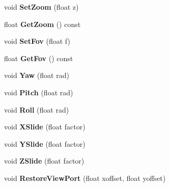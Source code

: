 \begin{DoxyCompactItemize}
\item 
void {\bfseries Set\+Zoom} (float z)\hypertarget{classCamera_ae260d200c0de40a8bd474b3e964fcec3}{}\label{classCamera_ae260d200c0de40a8bd474b3e964fcec3}

\item 
float {\bfseries Get\+Zoom} () const \hypertarget{classCamera_a68d9f0b5127fc2526bdb95840358dab8}{}\label{classCamera_a68d9f0b5127fc2526bdb95840358dab8}

\item 
void {\bfseries Set\+Fov} (float f)\hypertarget{classCamera_adc85190cf830510bb201522655562b1c}{}\label{classCamera_adc85190cf830510bb201522655562b1c}

\item 
float {\bfseries Get\+Fov} () const \hypertarget{classCamera_aaa4009f80907d3df162dca0a0ad410d3}{}\label{classCamera_aaa4009f80907d3df162dca0a0ad410d3}

\item 
void {\bfseries Yaw} (float rad)\hypertarget{classCamera_a73556e647628dfefe8506b90241810f0}{}\label{classCamera_a73556e647628dfefe8506b90241810f0}

\item 
void {\bfseries Pitch} (float rad)\hypertarget{classCamera_a1dcded3261d6692d2e7cc52095229afb}{}\label{classCamera_a1dcded3261d6692d2e7cc52095229afb}

\item 
void {\bfseries Roll} (float rad)\hypertarget{classCamera_a67c035a9486710b5535170c0df233751}{}\label{classCamera_a67c035a9486710b5535170c0df233751}

\item 
void {\bfseries X\+Slide} (float factor)\hypertarget{classCamera_ab83c459772d08e0489186f52b24d4553}{}\label{classCamera_ab83c459772d08e0489186f52b24d4553}

\item 
void {\bfseries Y\+Slide} (float factor)\hypertarget{classCamera_aaada743736f71994d5b02582d91dbb4c}{}\label{classCamera_aaada743736f71994d5b02582d91dbb4c}

\item 
void {\bfseries Z\+Slide} (float factor)\hypertarget{classCamera_ae1c71d445786ebc7734237667fe3b919}{}\label{classCamera_ae1c71d445786ebc7734237667fe3b919}

\item 
void {\bfseries Restore\+View\+Port} (float xoffset, float yoffset)\hypertarget{classCamera_a83727e5e3a0a4bf157067b9278ca9103}{}\label{classCamera_a83727e5e3a0a4bf157067b9278ca9103}

\end{DoxyCompactItemize}
